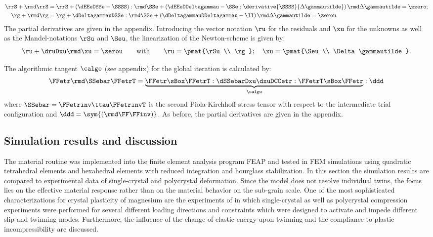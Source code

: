   \begin{align}
    \rrS + \rmd\rrS &= \rrS + \left(\dEEeDSSe-\SSSS\right):\rmd\SSe + \left(\dEEeDDeltagammau-\SSe:\derivative{\SSSS}{\Delta\gammautilde} \right)\rmd\Delta\gammautilde \label{eq:rrS} = \zzero; \\ %
    \rg + \rmd\rg &= \rg + \dDeltagammauDSSe:\rmd\SSe + \left( \dDeltagammauDDeltagammau - \II \right) \rmd\Delta\gammautilde = \zerou \label{eq:rg}.
  \end{align}
  The partial derivatives are given in the appendix. Introducing the vector notation $\ru$ for the residuals and $\xu$ for the unknowns as well as the Mandel-notations $\rSu$ and $\Seu$, the linearization of the Newton-scheme is given by:
  \begin{equation}
    \ru + \druDxu \rmd\xu = \zerou \qquad \text{with} \qquad \ru = \pmat{\rSu \\ \rg}; \quad \xu = \pmat{\Seu \\ \Delta\gammautilde}.
  \end{equation}

  The algorithmic tangent $\calgo$ (see appendix) for the global iteration is calculated by:
  \begin{align}
    \FFetr \rmd\SSebar \FFetrT = \underbrace{\FFetr \sBox \FFetrT : \dSSebarDxu \dxuDCCetr : \FFetrT \sBox \FFetr}_{\calgo} : \ddd
    \label{eq:calgo}
  \end{align}
  where $\SSebar=\FFetrinv \ttau \FFetrinvT$ is the second Piola-Kirchhoff stress tensor with respect to the intermediate trial configuration and $\ddd=\sym{(\rmd\FF\FFinv)}$. As before, the partial derivatives are given in the appendix. \\
 
  \subsection{Simulation results and discussion} %
  The material routine was implemented into the finite element analysis program FEAP\supercite{taylor2014feap} and tested in FEM simulations using quadratic tetrahedral elements and hexahedral elements with reduced integration and hourglass stabilization. In this section the simulation results are compared to experimental data of single-crystal and polycrystal deformation. Since the model does not resolve individual twins, the focus lies on the effective material response rather than on the material behavior on the sub-grain scale. One of the most sophisticated characterizations for crystal plasticity of magnesium are the experiments of  in which single-crystal as well as polycrystal compression experiments were performed for several different loading directions and constraints which were designed to activate and impede different slip and twinning modes. Furthermore, the influence of the change of elastic energy upon twinning and the compliance to plastic incompressibility are discussed.
  
